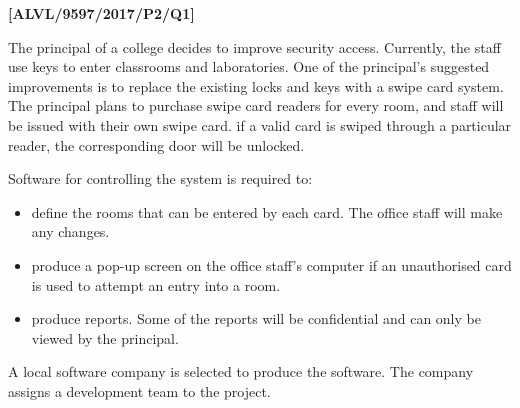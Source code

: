 \item \textbf{{[}ALVL/9597/2017/P2/Q1{]} }

The principal of a college decides to improve security access. Currently,
the staff use keys to enter classrooms and laboratories. One of the
principal\textquoteright s suggested improvements is to replace the
existing locks and keys with a swipe card system. The principal plans
to purchase swipe card readers for every room, and staff will be issued
with their own swipe card. if a valid card is swiped through a particular
reader, the corresponding door will be unlocked.

Software for controlling the system is required to: 
\begin{itemize}
\item define the rooms that can be entered by each card. The office staff
will make any changes. 
\item produce a pop-up screen on the office staff's computer if an unauthorised
card is used to attempt an entry into a room. 
\item produce reports. Some of the reports will be confidential and can
only be viewed by the principal. 
\end{itemize}
A local software company is selected to produce the software. The
company assigns a development team to the project. 
